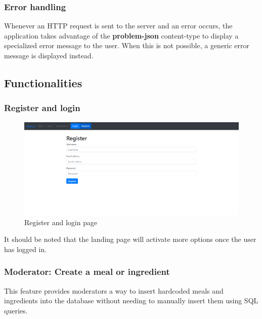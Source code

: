 \subsubsection{Error handling}

Whenever an HTTP request is sent to the server and an error occurs, the application takes
advantage of the \textbf{problem-json} content-type to display a specialized error message
to the user. When this is not possible, a generic error message is displayed instead.\\

\subsection{Functionalities}

\subsubsection{Register and login}

\begin{figure}[H]
    \begin{center}
        \includegraphics[scale=0.4]{_figures/register-page.png}
        \caption{Register and login page}
    \end{center}
\end{figure}

It should be noted that the landing page will activate more options once the user has logged in.\\

\subsubsection{Moderator: Create a meal or ingredient}

This feature provides moderators a way to insert hardcoded meals and ingredients into the database without
needing to manually insert them using SQL queries.\\

